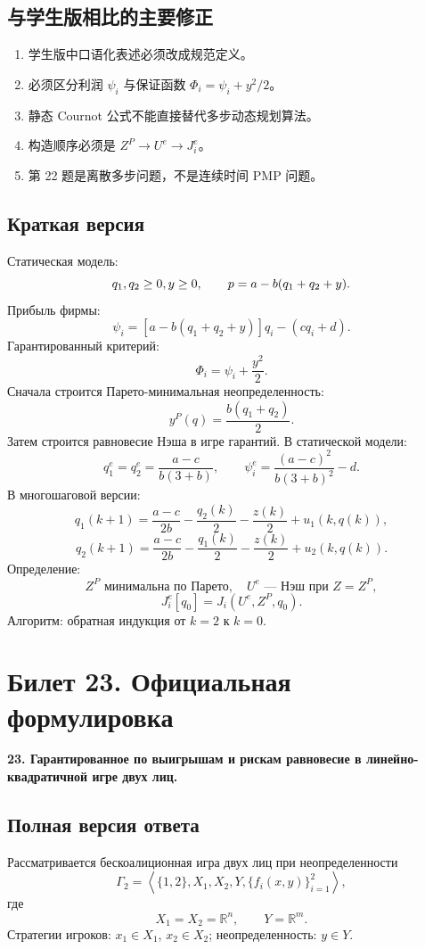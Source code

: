 \documentclass[12pt,a4paper]{article}
\newcommand{\R}{\mathbb{R}}
\begin{document}
\subsection{与学生版相比的主要修正}
\begin{enumerate}
  \item 学生版中口语化表述必须改成规范定义。
  \item 必须区分利润 $\psi_i$ 与保证函数 $\Phi_i=\psi_i+y^2/2$。
  \item 静态 Cournot 公式不能直接替代多步动态规划算法。
  \item 构造顺序必须是 $Z^P\rightarrow U^e\rightarrow J_i^e$。
  \item 第 22 题是离散多步问题，不是连续时间 PMP 问题。
\end{enumerate}

\subsection{Краткая версия}
Статическая модель:
\[
q_1,q_2\ge0,\\ y\ge0,
\qquad p=a-b(q_1+q_2+y).
\]
Прибыль фирмы:
\[
\psi_i=[a-b(q_1+q_2+y)]q_i-(cq_i+d).
\]
Гарантированный критерий:
\[
\Phi_i=\psi_i+\frac{y^2}{2}.
\]
Сначала строится Парето-минимальная неопределенность:
\[
y^P(q)=\frac{b(q_1+q_2)}{2}.
\]
Затем строится равновесие Нэша в игре гарантий. В статической модели:
\[
q_1^e=q_2^e=\frac{a-c}{b(3+b)},\qquad
\psi_i^e=\frac{(a-c)^2}{b(3+b)^2}-d.
\]
В многошаговой версии:
\[
q_1(k+1)=\frac{a-c}{2b}-\frac{q_2(k)}{2}-\frac{z(k)}{2}+u_1(k,q(k)),
\]
\[
q_2(k+1)=\frac{a-c}{2b}-\frac{q_1(k)}{2}-\frac{z(k)}{2}+u_2(k,q(k)).
\]
Определение:
\[
Z^P \text{ минимальна по Парето},\quad
U^e \text{ --- Нэш при } Z=Z^P,
\]
\[
J_i^e[q_0]=J_i(U^e,Z^P,q_0).
\]
Алгоритм: обратная индукция от $k=2$ к $k=0$.

\newpage
\section{Билет 23. Официальная формулировка}
\textbf{23. Гарантированное по выигрышам и рискам равновесие в линейно-квадратичной игре двух лиц.}

\subsection{Полная версия ответа}
Рассматривается бескоалиционная игра двух лиц при неопределенности
\[
\Gamma_2=\left\langle \{1,2\},X_1,X_2,Y,\{f_i(x,y)\}_{i=1}^2\right\rangle,
\]
где
\[
X_1=X_2=\R^n,
\qquad Y=\R^m.
\]
Стратегии игроков: $x_1\in X_1$, $x_2\in X_2$; неопределенность: $y\in Y$.
\end{document}

